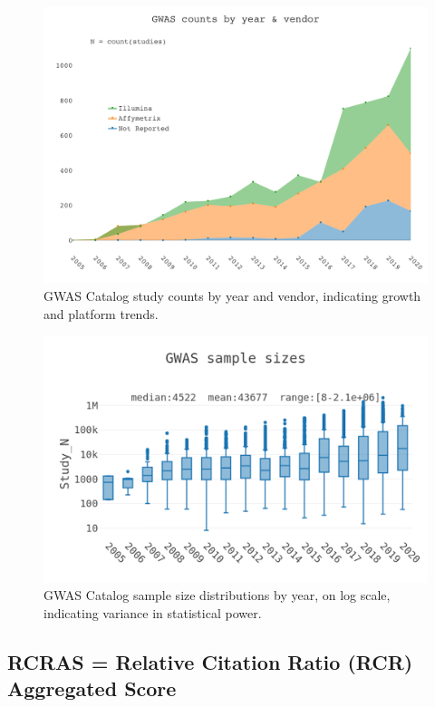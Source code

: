 \begin{figure}
	\includegraphics[width=\textwidth]{figures/tiga/FIG01_Study_counts.png}
	\caption{GWAS Catalog study counts by year and vendor, indicating growth and platform trends.}
	\label{fig:TIGA_Study_coun}
\end{figure}

\begin{figure}
	\includegraphics[width=\textwidth]{figures/tiga/FIG02_Sample_sizes.png}
	\caption{GWAS Catalog sample size distributions by year, on log scale, indicating variance in statistical power.}
	\label{fig:TIGA_Samp_sizes}
\end{figure}

\subsection{RCRAS = Relative Citation Ratio (RCR) Aggregated Score}

